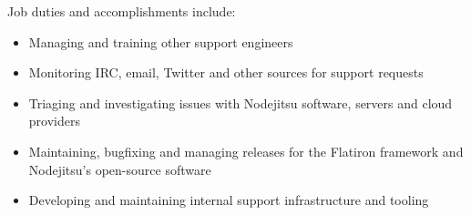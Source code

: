 \normalsize
Job duties and accomplishments include:
\small
\begin{itemize}
    \item Managing and training other support engineers
    \item Monitoring IRC, email, Twitter and other sources for support requests
    \item Triaging and investigating issues with Nodejitsu software, servers and cloud providers
    \item Maintaining, bugfixing and managing releases for the Flatiron framework and Nodejitsu's open-source software
    \item Developing and maintaining internal support infrastructure and tooling
\end{itemize}
\normalsize
\medskip
